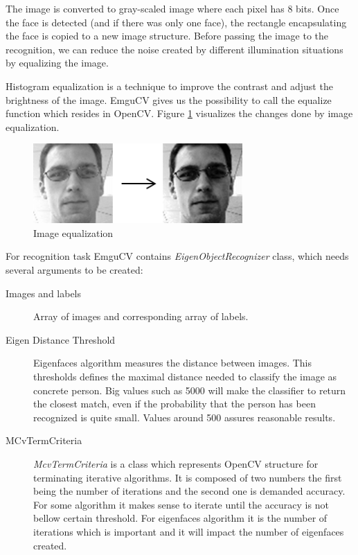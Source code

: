 The image is converted to gray-scaled image where each pixel has 8 bits. Once the face is detected (and if there was only one face), the rectangle encapsulating the face is copied to a new image structure. Before passing the image to the recognition, we can reduce the noise created by different illumination situations by equalizing the image.

Histogram equalization is a technique to improve the contrast and adjust the brightness of the image. EmguCV gives us the possibility to call the equalize function which resides in OpenCV. Figure \ref{fig:image_equalization} visualizes the changes done by image equalization.

\begin{figure}[h]
\begin{center}
\includegraphics[width=8cm]{figures/equalization}
\caption{Image equalization}
\label{fig:image_equalization}
\end{center}
\end{figure}

For recognition task EmguCV contains \textit{EigenObjectRecognizer} class, which needs several arguments to be created:
\begin{description}
	\item [Images and labels] Array of images and corresponding array of labels.
	\item [Eigen Distance Threshold] Eigenfaces algorithm measures the distance between images. This thresholds defines the maximal distance needed to classify the image as concrete person. Big values such as 5000 will make the classifier to return the closest match, even if the probability that the person has been recognized is quite small. Values around 500 assures reasonable results.
	\item [MCvTermCriteria] \textit{McvTermCriteria} is a class which represents OpenCV structure for terminating iterative algorithms. It is composed of two numbers the first being the number of iterations and the second one is demanded accuracy. For some algorithm it makes sense to iterate until the accuracy is not bellow certain threshold. For eigenfaces algorithm it is the number of iterations which is important and it will impact the number of eigenfaces created.
\end{description}

